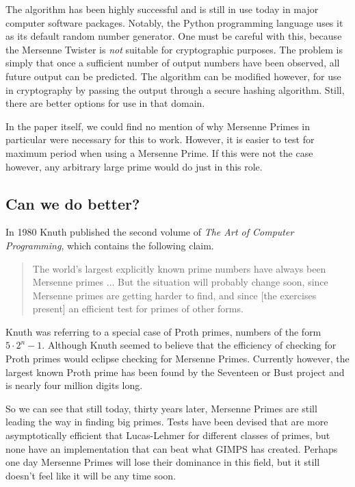 The algorithm has been highly successful and is still in use today in major computer software packages.  Notably, the Python programming language uses it as its default random number generator.  One must be careful with this, because the Mersenne Twister is \emph{not} suitable for cryptographic purposes. The problem is simply that once a sufficient number of output numbers have been observed, all future output can be predicted.  The algorithm can be modified however, for use in cryptography by passing the output through a secure hashing algorithm\cite{mt}.  Still, there are better options for use in that domain.

In the paper itself, we could find no mention of why Mersenne Primes in particular were necessary for this to work.  However, it is easier to test for maximum period when using a Mersenne Prime\cite{mt2}. If this were not the case however, any arbitrary large prime would do just in this role.
\subsection{Can we do better?}
\label{sec:knuth}
In 1980 Knuth published the second volume of \emph{The Art of Computer Programming}, which contains the following claim.

\begin{quote}
The world’s largest explicitly known prime numbers have always been Mersenne primes ... But the situation will probably change soon, since Mersenne primes are getting harder to find, and since [the exercises present] an efficient test for primes of other forms. \cite{taocp}
\end{quote}

Knuth was referring to a special case of Proth primes, numbers of the form $5\cdot2^n-1$.
Although Knuth seemed to believe that the efficiency of checking for Proth primes would
eclipse checking for Mersenne Primes. Currently however, the largest known Proth prime has
been found by the Seventeen or Bust project and is nearly four million digits long\cite{seventeenorbust}.

So we can see that still today, thirty years later, Mersenne Primes are still leading the way in finding big primes.  Tests have been devised that are more asymptotically efficient that Lucas-Lehmer for different classes of primes, but none have an implementation that can beat what GIMPS has created.  Perhaps one day Mersenne Primes will lose their dominance in this field, but it still doesn't feel like it will be any time soon.

